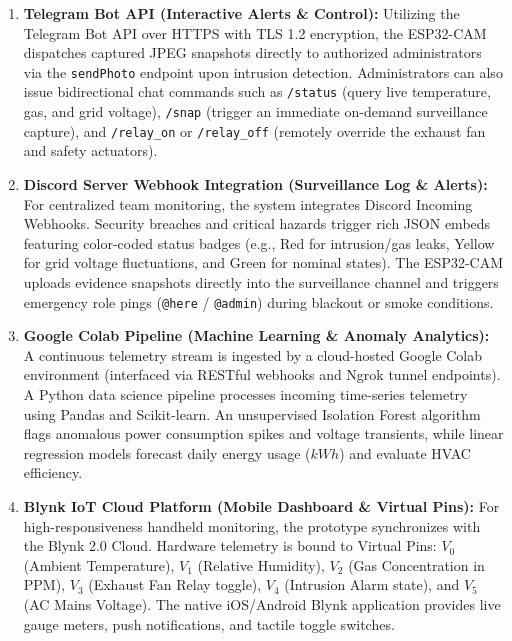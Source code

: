 \documentclass[12pt,a4paper]{article}
\begin{document}
\begin{enumerate}
    \item \textbf{Telegram Bot API (Interactive Alerts \& Control):} Utilizing the Telegram Bot API over HTTPS with TLS 1.2 encryption, the ESP32-CAM dispatches captured JPEG snapshots directly to authorized administrators via the \texttt{sendPhoto} endpoint upon intrusion detection. Administrators can also issue bidirectional chat commands such as \texttt{/status} (query live temperature, gas, and grid voltage), \texttt{/snap} (trigger an immediate on-demand surveillance capture), and \texttt{/relay\_on} or \texttt{/relay\_off} (remotely override the exhaust fan and safety actuators).
    
    \item \textbf{Discord Server Webhook Integration (Surveillance Log \& Alerts):} For centralized team monitoring, the system integrates Discord Incoming Webhooks. Security breaches and critical hazards trigger rich JSON embeds featuring color-coded status badges (e.g., Red for intrusion/gas leaks, Yellow for grid voltage fluctuations, and Green for nominal states). The ESP32-CAM uploads evidence snapshots directly into the surveillance channel and triggers emergency role pings (\texttt{@here} / \texttt{@admin}) during blackout or smoke conditions.
    
    \item \textbf{Google Colab Pipeline (Machine Learning \& Anomaly Analytics):} A continuous telemetry stream is ingested by a cloud-hosted Google Colab environment (interfaced via RESTful webhooks and Ngrok tunnel endpoints). A Python data science pipeline processes incoming time-series telemetry using Pandas and Scikit-learn. An unsupervised Isolation Forest algorithm flags anomalous power consumption spikes and voltage transients, while linear regression models forecast daily energy usage ($kWh$) and evaluate HVAC efficiency.
    
    \item \textbf{Blynk IoT Cloud Platform (Mobile Dashboard \& Virtual Pins):} For high-responsiveness handheld monitoring, the prototype synchronizes with the Blynk 2.0 Cloud. Hardware telemetry is bound to Virtual Pins: $V_0$ (Ambient Temperature), $V_1$ (Relative Humidity), $V_2$ (Gas Concentration in PPM), $V_3$ (Exhaust Fan Relay toggle), $V_4$ (Intrusion Alarm state), and $V_5$ (AC Mains Voltage). The native iOS/Android Blynk application provides live gauge meters, push notifications, and tactile toggle switches.
\end{enumerate}
\end{document}
